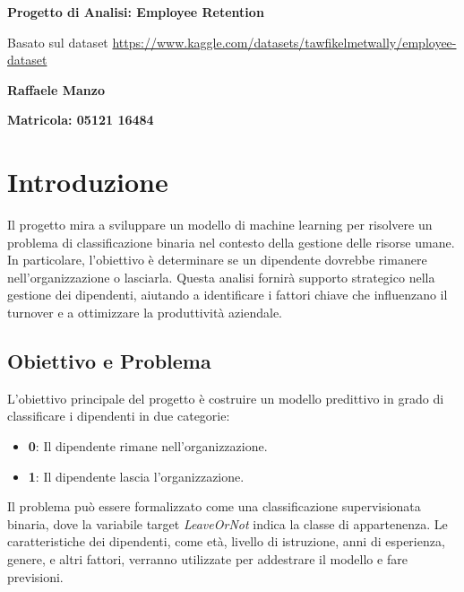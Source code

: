\documentclass[a4paper,12pt]{article}
\begin{document}
\begin{center}
    \vspace*{1cm}
    
    \Huge
    \textbf{Progetto di Analisi: Employee Retention}
    
    \vspace{0.5cm}
    \large
    Basato sul dataset \url{https://www.kaggle.com/datasets/tawfikelmetwally/employee-dataset}
    
    \vspace{1.5cm}
    
    \textbf{Raffaele Manzo}
    
    \vfill
    
    \large
    \textbf{Matricola: 05121 16484}
\end{center}


\tableofcontents
\newpage

\section{Introduzione}
Il progetto mira a sviluppare un modello di machine learning per risolvere un problema di classificazione binaria nel contesto della gestione delle risorse umane. In particolare, l'obiettivo è determinare se un dipendente dovrebbe rimanere nell'organizzazione o lasciarla. Questa analisi fornirà supporto strategico nella gestione dei dipendenti, aiutando a identificare i fattori chiave che influenzano il turnover e a ottimizzare la produttività aziendale.

\subsection{Obiettivo e Problema}
L'obiettivo principale del progetto è costruire un modello predittivo in grado di classificare i dipendenti in due categorie:
\begin{itemize}
    \item \textbf{0}: Il dipendente rimane nell'organizzazione.
    \item \textbf{1}: Il dipendente lascia l'organizzazione.
\end{itemize}

Il problema può essere formalizzato come una classificazione supervisionata binaria, dove la variabile target \textit{LeaveOrNot} indica la classe di appartenenza. Le caratteristiche dei dipendenti, come età, livello di istruzione, anni di esperienza, genere, e altri fattori, verranno utilizzate per addestrare il modello e fare previsioni.
\end{document}
